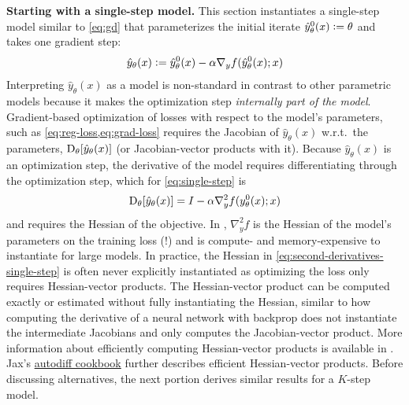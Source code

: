 \textbf{Starting with a single-step model.}
This section instantiates a single-step model
similar to \cref{eq:gd} that parameterizes the initial
iterate $\hat y^0_\theta(x)\vcentcolon=\theta$ and takes one gradient step:
\begin{equation}
  \hat y_\theta(x)\vcentcolon= \hat y^0_\theta(x) - \alpha \nabla_y f(\hat y^0_\theta(x); x)
  \label{eq:single-step}
\end{equation}
Interpreting $\hat y_\theta(x)$ as a model is non-standard in contrast
to other parametric models because it makes the
optimization step \emph{internally part of the model}.
Gradient-based optimization of losses with respect to the model's parameters,
such as \cref{eq:reg-loss,eq:grad-loss} requires the Jacobian of $\hat y_\theta(x)$
w.r.t.~the parameters, \ie $\mathrm{D}_\theta[\hat y_\theta(x)]$
(or Jacobian-vector products with it).
Because $\hat y_\theta(x)$ is an optimization step, the derivative
of the model requires differentiating through the optimization step,
which for \cref{eq:single-step} is
\begin{equation}
  \mathrm{D}_\theta[\hat y_\theta(x)] = I-\alpha \nabla_y^2 f(y_\theta^0(x); x)
  \label{eq:second-derivatives-single-step}
\end{equation}
and requires the Hessian of the objective.
In \citet{finn2017model}, $\nabla_y^2 f$ is the Hessian of the
model's parameters on the training loss (!) and is
compute- and memory-expensive to instantiate for large models.
In practice, the Hessian in \cref{eq:second-derivatives-single-step}
is often never explicitly instantiated as optimizing the
loss only requires Hessian-vector products.
The Hessian-vector product can be computed exactly or
estimated without fully instantiating the Hessian, similar to
how computing the derivative of a neural network with backprop
does not instantiate the intermediate Jacobians and only computes
the Jacobian-vector product.
More information about efficiently computing Hessian-vector products
is available in \citet{pearlmutter1994fast,domke2012generic}.
Jax's \href{https://github.com/google/jax/blob/27360b9/docs/notebooks/autodiff_cookbook.ipynb}{autodiff cookbook}
\citep{bradbury2020jax}
further describes efficient Hessian-vector products.
Before discussing alternatives,
the next portion derives similar results for a $K$-step model.


